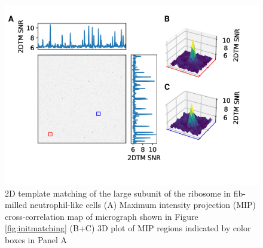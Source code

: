 \documentclass[
]{article}
\newenvironment{fignos:tagged-figure}[1][]{
    \let\oldthefigure\thefigure
    \let\oldtheHfigure\theHfigure
    \renewcommand{\thefigure}{#1}
    \renewcommand{\theHfigure}{#1}
  }{
    \let\thefigure\oldthefigure
    \let\theHfigure\oldtheHfigure
    \addtocounter{figure}{-1}
  }
\begin{document}
\begin{fignos:tagged-figure}

\begin{figure}
\hypertarget{fig:initmatching2}{%
\centering
\includegraphics{figures/initmatching2.png}
\caption{2D template matching of the large subunit of the ribosome in fib-milled
neutrophil-like cells (A) Maximum intensity projection (MIP) cross-correlation map of
micrograph shown in Figure
\ref{fig:initmatching} (B+C) 3D plot of MIP regions indicated by color boxes in Panel A}\label{fig:initmatching2}
}
\end{figure}

\end{fignos:tagged-figure}
\end{document}
